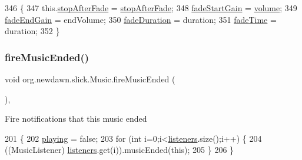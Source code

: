\begin{DoxyCode}
346                                                                             \{
347         this.\mbox{\hyperlink{classorg_1_1newdawn_1_1slick_1_1_music_af40d098a3f18a0235d9daab0844edf7a}{stopAfterFade}} = \mbox{\hyperlink{classorg_1_1newdawn_1_1slick_1_1_music_af40d098a3f18a0235d9daab0844edf7a}{stopAfterFade}};
348         \mbox{\hyperlink{classorg_1_1newdawn_1_1slick_1_1_music_adae9aee08679631db780fea46d48735d}{fadeStartGain}} = \mbox{\hyperlink{classorg_1_1newdawn_1_1slick_1_1_music_a2fa10b80767b1a05925e1dc89a088e90}{volume}};
349         \mbox{\hyperlink{classorg_1_1newdawn_1_1slick_1_1_music_a12c7133766d347ffbcf8d6e506165251}{fadeEndGain}} = endVolume;
350         \mbox{\hyperlink{classorg_1_1newdawn_1_1slick_1_1_music_adf35608195f978bed903af885397dd75}{fadeDuration}} = duration;
351         \mbox{\hyperlink{classorg_1_1newdawn_1_1slick_1_1_music_a83dfc85ef4588e511d667c78e882f3f3}{fadeTime}} = duration;
352     \}
\end{DoxyCode}
\mbox{\label{classorg_1_1newdawn_1_1slick_1_1_music_af35afdd15c12852bb797b5661e7f46b6}} 
\subsubsection{\texorpdfstring{fire\+Music\+Ended()}{fireMusicEnded()}}
{\footnotesize\ttfamily void org.\+newdawn.\+slick.\+Music.\+fire\+Music\+Ended (\begin{DoxyParamCaption}{ }\end{DoxyParamCaption})\hspace{0.3cm}{\ttfamily [inline]}, {\ttfamily [private]}}

Fire notifications that this music ended 
\begin{DoxyCode}
201                                   \{
202         \mbox{\hyperlink{classorg_1_1newdawn_1_1slick_1_1_music_a20709d497ca9027d874f7ffe970ce738}{playing}} = \textcolor{keyword}{false};
203         \textcolor{keywordflow}{for} (\textcolor{keywordtype}{int} i=0;i<\mbox{\hyperlink{classorg_1_1newdawn_1_1slick_1_1_music_ad57b22ce1f989d377f00f3c804a41db4}{listeners}}.size();i++) \{
204             ((MusicListener) \mbox{\hyperlink{classorg_1_1newdawn_1_1slick_1_1_music_ad57b22ce1f989d377f00f3c804a41db4}{listeners}}.get(i)).musicEnded(\textcolor{keyword}{this});
205         \}
206     \}
\end{DoxyCode}
\mbox{\label{classorg_1_1newdawn_1_1slick_1_1_music_af4a8c635af98f064cc069383e64eed66}} 
